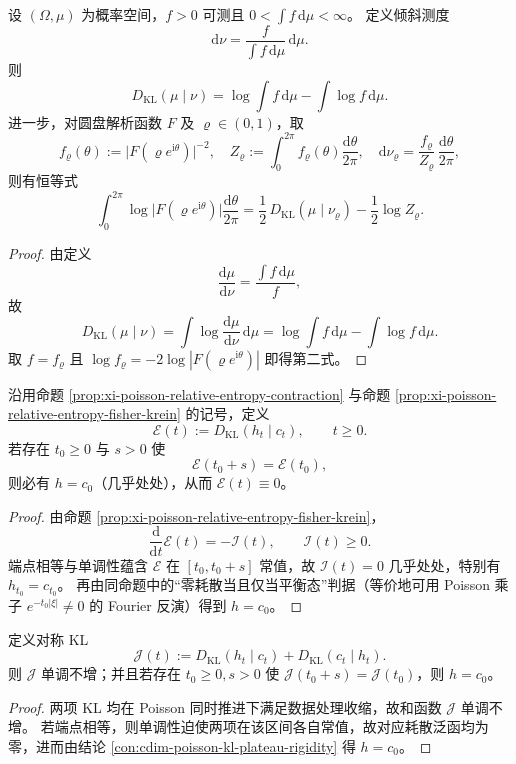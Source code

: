 \begin{conclusion}\label{con:cdim-jensen-average-reverse-kl-splitting}
设 \((\Omega,\mu)\) 为概率空间，\(f>0\) 可测且 \(0<\int f\,\mathrm d\mu<\infty\)。
定义倾斜测度
\[
\mathrm d\nu=\frac{f}{\int f\,\mathrm d\mu}\,\mathrm d\mu.
\]
则
\[
D_{\mathrm{KL}}(\mu\mid \nu)=\log\!\int f\,\mathrm d\mu-\int \log f\,\mathrm d\mu.
\]
进一步，对圆盘解析函数 \(F\) 及 \(\varrho\in(0,1)\)，取
\[
f_\varrho(\theta):=\bigl|F(\varrho e^{\mathrm i\theta})\bigr|^{-2},
\quad
Z_\varrho:=\int_0^{2\pi}f_\varrho(\theta)\frac{\mathrm d\theta}{2\pi},
\quad
\mathrm d\nu_\varrho=\frac{f_\varrho}{Z_\varrho}\,\frac{\mathrm d\theta}{2\pi},
\]
则有恒等式
\[
\int_0^{2\pi}\log\bigl|F(\varrho e^{\mathrm i\theta})\bigr|\frac{\mathrm d\theta}{2\pi}
=
\frac12\,D_{\mathrm{KL}}(\mu\mid \nu_\varrho)-\frac12\log Z_\varrho.
\]
\end{conclusion}
\begin{proof}
由定义
\[
\frac{\mathrm d\mu}{\mathrm d\nu}
=
\frac{\int f\,\mathrm d\mu}{f},
\]
故
\[
D_{\mathrm{KL}}(\mu\mid\nu)
=
\int \log\frac{\mathrm d\mu}{\mathrm d\nu}\,\mathrm d\mu
=
\log\!\int f\,\mathrm d\mu-\int\log f\,\mathrm d\mu.
\]
取 \(f=f_\varrho\) 且 \(\log f_\varrho=-2\log|F(\varrho e^{\mathrm i\theta})|\) 即得第二式。
\end{proof}

\begin{conclusion}\label{con:cdim-poisson-kl-plateau-rigidity}
沿用命题 \ref{prop:xi-poisson-relative-entropy-contraction} 与命题 \ref{prop:xi-poisson-relative-entropy-fisher-krein} 的记号，定义
\[
\mathcal E(t):=D_{\mathrm{KL}}(h_t\mid c_t),\qquad t\ge 0.
\]
若存在 \(t_0\ge 0\) 与 \(s>0\) 使
\[
\mathcal E(t_0+s)=\mathcal E(t_0),
\]
则必有 \(h=c_0\)（几乎处处），从而 \(\mathcal E(t)\equiv 0\)。
\end{conclusion}
\begin{proof}
由命题 \ref{prop:xi-poisson-relative-entropy-fisher-krein}，
\[
\frac{\mathrm d}{\mathrm dt}\mathcal E(t)=-\mathcal I(t),\qquad \mathcal I(t)\ge 0.
\]
端点相等与单调性蕴含 \(\mathcal E\) 在 \([t_0,t_0+s]\) 常值，故 \(\mathcal I(t)=0\) 几乎处处，特别有 \(h_{t_0}=c_{t_0}\)。
再由同命题中的“零耗散当且仅当平衡态”判据（等价地可用 Poisson 乘子 \(e^{-t_0|\xi|}\neq 0\) 的 Fourier 反演）得到 \(h=c_0\)。
\end{proof}

\begin{conclusion}[对称 KL 的严格耗散与双侧平台唯一性]\label{con:cdim-poisson-jeffreys-dissipation-rigidity}
定义对称 KL
\[
\mathcal J(t):=D_{\mathrm{KL}}(h_t\mid c_t)+D_{\mathrm{KL}}(c_t\mid h_t).
\]
则 \(\mathcal J\) 单调不增；并且若存在 \(t_0\ge 0,s>0\) 使 \(\mathcal J(t_0+s)=\mathcal J(t_0)\)，则 \(h=c_0\)。
\end{conclusion}
\begin{proof}
两项 KL 均在 Poisson 同时推进下满足数据处理收缩，故和函数 \(\mathcal J\) 单调不增。
若端点相等，则单调性迫使两项在该区间各自常值，故对应耗散泛函均为零，进而由结论 \ref{con:cdim-poisson-kl-plateau-rigidity} 得 \(h=c_0\)。
\end{proof}

